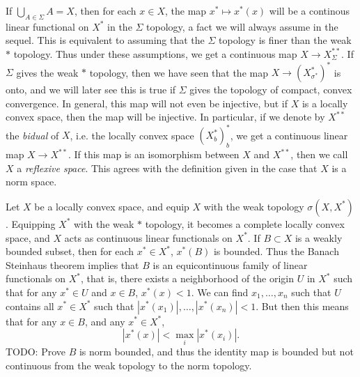 If $\bigcup_{A \in \Sigma} A = X$, then for each $x \in X$, the map $x^* \mapsto x^*(x)$ will be a continous linear functional on $X^*$ in the $\Sigma$ topology, a fact we will always assume in the sequel. This is equivalent to assuming that the $\Sigma$ topology is finer than the weak $*$ topology. Thus under these assumptions, we get a continuous map $X \to X^{**}_\Sigma$. If $\Sigma$ gives the weak $*$ topology, then we have seen that the map $X \to (X^*_{\sigma^*})^*$ is onto, and we will later see this is true if $\Sigma$ gives the topology of compact, convex convergence. In general, this map will not even be injective, but if $X$ is a locally convex space, then the map will be injective. In particular, if we denote by $X^{**}$ the \emph{bidual} of $X$, i.e. the locally convex space $(X^*_b)^*_b$, we get a continuous linear map $X \to X^{**}$. If this map is an isomorphism between $X$ and $X^{**}$, then we call $X$ a \emph{reflexive space}. This agrees with the definition given in the case that $X$ is a norm space.

\begin{example}
    Let $X$ be a locally convex space, and equip $X$ with the weak topology $\sigma(X,X^*)$. Equipping $X^*$ with the weak $*$ topology, it becomes a complete locally convex space, and $X$ acts as continuous linear functionals on $X^*$. If $B \subset X$ is a weakly bounded subset, then for each $x^* \in X^*$, $x^*(B)$ is bounded. Thus the Banach Steinhaus theorem implies that $B$ is an equicontinuous family of linear functionals on $X^*$, that is, there exists a neighborhood of the origin $U$ in $X^*$ such that for any $x^* \in U$ and $x \in B$, $x^*(x) < 1$. We can find $x_1,\dots,x_n$ such that $U$ contains all $x^* \in X^*$ such that $|x^*(x_1)|, \dots, |x^*(x_n)| < 1$. But then this means that for any $x \in B$, and any $x^* \in X^*$,
    \[ |x^*(x)| < \max_i |x^*(x_i)|. \]
    TODO: Prove $B$ is norm bounded, and thus the identity map is bounded but not continuous from the weak topology to the norm topology.
\end{example}

